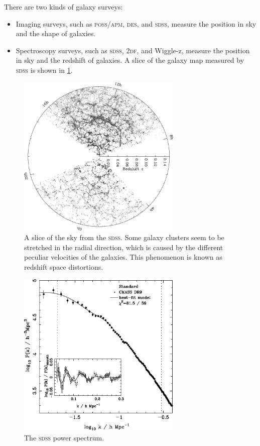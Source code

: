 There are two kinds of galaxy surveys:
\begin{itemize}
	\item Imaging surveys, such as \textsc{poss}/\textsc{apm}, \textsc{des}, and \textsc{sdss}, measure the position in sky and the shape of galaxies.
	\item Spectroscopy surveys, such as \textsc{sdss}, \textsc{2df}, and Wiggle-z, measure the position in sky and the redshift of galaxies. A slice of the galaxy map measured by \textsc{sdss} is shown in \cref{fig:spectroscopic-survey}.
\end{itemize}

\begin{figure}
	\centering
	\includegraphics[width=0.7\textwidth]{img/ch-03/sdss.jpeg}
	\caption{A slice of the sky from the \textsc{sdss}. Some galaxy clusters seem to be stretched in the radial direction, which is caused by the different peculiar velocities of the galaxies. This phenomenon is known as redshift space distortions.}
	\label{fig:spectroscopic-survey}
\end{figure}

\begin{figure}
	\centering
	\includegraphics[width=0.7\textwidth]{img/ch-03/sdss-power-spectrum.pdf}
	\caption{The \textsc{sdss} power spectrum.}
	\label{fig:sdss-power-spectrum}
\end{figure}

